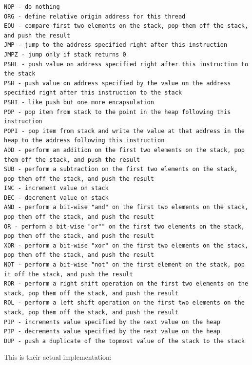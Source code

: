 \documentclass[letterpaper, 12pt]{article}
\begin{document}
\begin{Verbatim}[fontfamily=courier, xleftmargin=\parindent]
NOP - do nothing
ORG - define relative origin address for this thread
EQU - compare first two elements on the stack, pop them off the stack, and push the result
JMP - jump to the address specified right after this instruction
JMPZ - jump only if stack returns 0
PSHL - push value on address specified right after this instruction to the stack
PSH - push value on address specified by the value on the address specified right after this instruction to the stack
PSHI - like push but one more encapsulation
POP - pop item from stack to the point in the heap following this instruction
POPI - pop item from stack and write the value at that address in the heap to the address following this instruction
ADD - perform an addition on the first two elements on the stack, pop them off the stack, and push the result
SUB - perform a subtraction on the first two elements on the stack, pop them off the stack, and push the result
INC - increment value on stack
DEC - decrement value on stack
AND - perform a bit-wise "and" on the first two elements on the stack, pop them off the stack, and push the result
OR - perform a bit-wise "or"" on the first two elements on the stack, pop them off the stack, and push the result
XOR - perform a bit-wise "xor" on the first two elements on the stack, pop them off the stack, and push the result
NOT - perform a bit-wise "not" on the first element on the stack, pop it off the stack, and push the result
ROR - perform a right shift operation on the first two elements on the stack, pop them off the stack, and push the result
ROL - perform a left shift operation on the first two elements on the stack, pop them off the stack, and push the result
PIP - increments value specified by the next value on the heap
PIP - decrements value specified by the next value on the heap
DUP - push a duplicate of the topmost value of the stack to the stack
\end{Verbatim}

This is their actual implementation:
\end{document}
